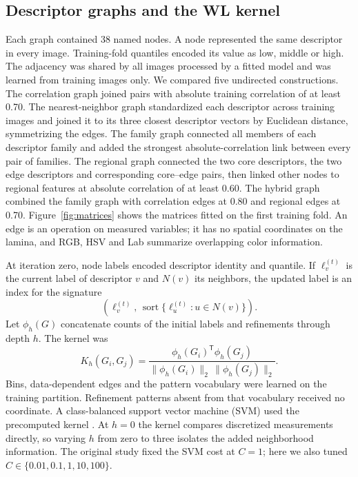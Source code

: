 \subsection{Descriptor graphs and the WL kernel}
Each graph contained 38 named nodes. A node represented the same descriptor in every image. Training-fold quantiles encoded its value as low, middle or high. The adjacency was shared by all images processed by a fitted model and was learned from training images only. We compared five undirected constructions. The correlation graph joined pairs with absolute training correlation of at least 0.70. The nearest-neighbor graph standardized each descriptor across training images and joined it to its three closest descriptor vectors by Euclidean distance, symmetrizing the edges. The family graph connected all members of each descriptor family and added the strongest absolute-correlation link between every pair of families. The regional graph connected the two core descriptors, the two edge descriptors and corresponding core--edge pairs, then linked other nodes to regional features at absolute correlation of at least 0.60. The hybrid graph combined the family graph with correlation edges at 0.80 and regional edges at 0.70. Figure~\ref{fig:matrices} shows the matrices fitted on the first training fold. An edge is an operation on measured variables; it has no spatial coordinates on the lamina, and RGB, HSV and Lab summarize overlapping color information.
\showpanel{\matrixpanel}

At iteration zero, node labels encoded descriptor identity and quantile. If $\ell_v^{(t)}$ is the current label of descriptor $v$ and $N(v)$ its neighbors, the updated label is an index for the signature
\begin{equation}
  \left(\ell_v^{(t)},\,\operatorname{sort}\{\ell_u^{(t)}:u\in N(v)\}\right).
\end{equation}
Let $\phi_h(G)$ concatenate counts of the initial labels and refinements through depth $h$. The kernel was
\begin{equation}
 K_h(G_i,G_j)=\frac{\phi_h(G_i)^\mathsf{T}\phi_h(G_j)}
 {\|\phi_h(G_i)\|_2\,\|\phi_h(G_j)\|_2}.
\end{equation}
Bins, data-dependent edges and the pattern vocabulary were learned on the training partition. Refinement patterns absent from that vocabulary received no coordinate. A class-balanced support vector machine (SVM) used the precomputed kernel \citep{Cortes1995}. At $h=0$ the kernel compares discretized measurements directly, so varying $h$ from zero to three isolates the added neighborhood information. The original study fixed the SVM cost at $C=1$; here we also tuned $C\in\{0.01,0.1,1,10,100\}$.


